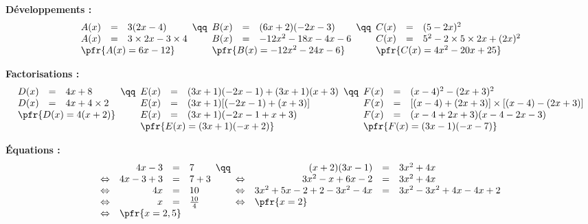 \documentclass[french,10pt]{article}
\newcommand\Resultat[1]{%
\multicolumn{3}{l}{\pfr{#1}}%
}
\begin{document}
\begin{center}
	\textbf{}
\end{center}

\textbf{Développements :}
\[
\begin{array}[t]{rcl}
	A(x) & = & 3(2x - 4) \\
	A(x) & = & 3 \times 2x - 3 \times 4 \\
	\Resultat{A(x) = 6x - 12}
\end{array}
\qq
\begin{array}[t]{rcl}
	B(x) & = & (6x + 2)(-2x - 3) \\
	B(x) & = & -12x^2 - 18x - 4x - 6 \\
	\Resultat{B(x) = -12x^2 - 24x - 6}
\end{array}
\qq
\begin{array}[t]{rcl}
	C(x) & = & (5 - 2x)^2 \\
	C(x) & = & 5^2 - 2 \times 5 \times 2x + (2x)^2\\
	\Resultat{C(x) = 4x^2 - 20x + 25}
\end{array}
\]

\textbf{Factorisations :}
\[
\begin{array}[t]{rcl}
	D(x) & = & 4x + 8 \\
	D(x) & = & 4x + 4 \times 2 \\
	\Resultat{D(x) = 4(x + 2)}
\end{array}
\qq
\begin{array}[t]{rcl}
	E(x) & = & (3x + 1)(-2x - 1) + (3x + 1)(x + 3) \\
	E(x) & = & (3x + 1)[(-2x - 1) + (x + 3)] \\
	E(x) & = & (3x + 1)(-2x - 1 + x + 3) \\
	\Resultat{E(x) = (3x + 1)(-x + 2)}
\end{array}
\qq
\begin{array}[t]{rcl}
	F(x) & = & (x - 4)^2 - (2x + 3)^2 \\
	F(x) & = & [(x - 4) + (2x + 3)] \times [(x - 4) - (2x + 3)] \\
	F(x) & = & (x - 4 + 2x + 3)(x - 4 - 2x - 3) \\
	\Resultat{F(x) = (3x - 1)(-x - 7)}
\end{array}
\]

\textbf{\'Equations :}
\[\begin{array}[t]{crcl}
	& 4x - 3 & = & 7 \\
	\Leftrightarrow & 4x - 3 + 3 & = & 7 + 3 \\
	\Leftrightarrow & 4x & = & 10 \\
	\Leftrightarrow & x & = & \frac{10}{4} \\
	\Leftrightarrow & \Resultat{x = 2,5}
\end{array}
\qq
\begin{array}[t]{crcl}
	& (x + 2)(3x - 1) & = & 3x^2 + 4x \\
	\Leftrightarrow & 3x^2 -x + 6x - 2  & = & 3x^2 + 4x \\
	\Leftrightarrow & 3x^2 + 5x -2 + 2 -3x^2 - 4x & = & 3x^2 - 3x^2 + 4x - 4x + 2  \\
	\Leftrightarrow & \Resultat{x = 2}
\end{array}
\]
\end{document}
